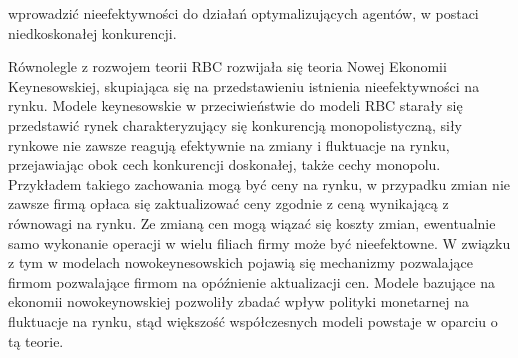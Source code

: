 



wprowadzić  nieefektywności do działań optymalizujących agentów, w postaci niedkoskonałej konkurencji. 

Równolegle z rozwojem teorii RBC rozwijała się teoria Nowej Ekonomii Keynesowskiej, skupiająca się na przedstawieniu istnienia nieefektywności na rynku. Modele keynesowskie w przeciwieństwie do modeli RBC starały się przedstawić rynek charakteryzujący się konkurencją monopolistyczną, siły rynkowe nie zawsze reagują efektywnie na zmiany i fluktuacje na rynku, przejawiając obok cech konkurencji doskonałej, także cechy monopolu. Przykładem takiego zachowania mogą być ceny na rynku, w przypadku zmian nie zawsze firmą opłaca się zaktualizować ceny zgodnie z ceną wynikającą z równowagi na rynku. Ze zmianą cen mogą wiązać się koszty zmian, ewentualnie samo wykonanie operacji w wielu filiach firmy może być nieefektowne. W związku z tym w modelach nowokeynesowskich pojawią się mechanizmy pozwalające firmom pozwalające firmom na opóźnienie aktualizacji cen. 
Modele bazujące na ekonomii nowokeynowskiej pozwoliły zbadać wpływ polityki monetarnej na fluktuacje na rynku, stąd większość współczesnych modeli powstaje w oparciu o tą teorie.




